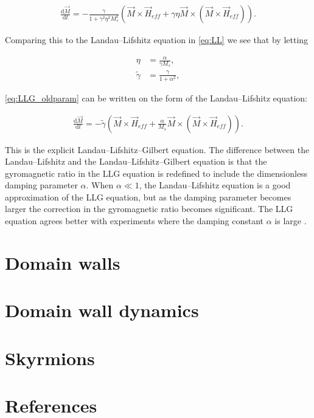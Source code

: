 \documentclass[1p]{elsarticle}		%
\begin{document}
\begin{align}
\label{eq:LLG_oldparam}
\frac{\textrm{d} \vec{M}}{\textrm{d} t} = -\frac{\gamma}{1 + \gamma^2\eta^2 M_s^2}(\vec{M}\times\vec{H}_{eff} + \gamma\eta \vec{M} \times (\vec{M}\times\vec{H}_{eff})).
\end{align}

Comparing this to the Landau--Lifshitz equation in \eqref{eq:LL} we see that by letting

\begin{align}
\eta &= \frac{\alpha}{\gamma M_s}, \\
\tilde{\gamma} &= \frac{\gamma}{1+\alpha^2},
\end{align}

\eqref{eq:LLG_oldparam} can be written on the form of the Landau--Lifshitz equation:

\begin{align}
\label{eq:LLG}
\frac{\textrm{d} \vec{M}}{\textrm{d} t} = -\tilde{\gamma} (\vec{M} \times \vec{H}_{eff} + \frac{\alpha}{M_s} \vec{M}\times(\vec{M}\times\vec{H}_{eff})).
\end{align}

This is the explicit Landau--Lifshitz--Gilbert equation. The difference between the Landau--Lifshitz and the Landau--Lifshitz--Gilbert equation is that the gyromagnetic ratio in the LLG equation is redefined to include the dimensionless damping parameter $\alpha$. When $\alpha \ll 1$, the Landau--Lifshitz equation is a good approximation of the LLG equation, but as the damping parameter becomes larger the correction in the gyromagnetic ratio becomes significant. The LLG equation agrees better with experiments where the damping constant $\alpha$ is large \cite{GilbertKelly1955}.

\section{Domain walls}

\section{Domain wall dynamics}

\section{Skyrmions}

\section{References}


\end{document}
